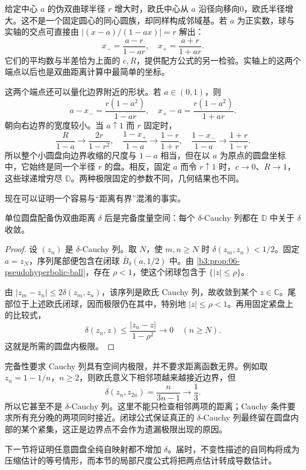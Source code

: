 给定中心 \(a\) 的伪双曲球半径 \(r\) 增大时，欧氏中心从 \(a\) 沿径向移向0，欧氏半径增大。这不是一个固定圆心的同心圆族，却同样构成邻域基。若 \(a\) 为正实数，球与实轴的交点可直接由 \(|(x-a)/(1-ax)|=r\) 解出：
\[
 x_- =\frac{a-r}{1-ar},\quad x_+=\frac{a+r}{1+ar}.
\]
它们的平均数与半差恰为上面的 \(c,R\)，提供配方公式的另一检验。实轴上的这两个端点以后也是双曲距离计算中最简单的坐标。

\ProseParagraphBreak
这两个端点还可以量化边界附近的形状。若 \(a\in(0,1)\)，则
\[
 a-x_-=\frac{r(1-a^2)}{1-ar},\quad
 x_+-a=\frac{r(1-a^2)}{1+ar}.
\]
朝向右边界的宽度较小。当 \(a\uparrow1\) 而 \(r\) 固定时，
\[
 \frac{R}{1-a}\longrightarrow\frac{2r}{1-r^2},\quad
 \frac{1-x_+}{1-a}\longrightarrow\frac{1-r}{1+r},\quad
 \frac{1-x_-}{1-a}\longrightarrow\frac{1+r}{1-r}.
\]
所以整个小圆盘向边界收缩的尺度与 \(1-a\) 相当，但在以 \(a\) 为原点的圆盘坐标中，它始终是同一个半径 \(r\) 的盘。相反，固定 \(a\) 而令 \(r\uparrow1\) 时，\(c\to0\)、\(R\to1\)，这些球递增穷尽 \(\mathbb D\)。两种极限固定的参数不同，几何结果也不同。

\ProseParagraphBreak

现在可以证明一个容易与“距离有界”混淆的事实。

\begin{proposition}\label{b3:prop:06-pseudohyperbolic-complete}
单位圆盘配备伪双曲距离 \(\delta\) 后是完备度量空间：每个 \(\delta\)-Cauchy 列都在 \(\mathbb D\) 中关于 \(\delta\) 收敛。
\end{proposition}
\begin{proof}
设 \((z_n)\) 是 \(\delta\)-Cauchy 列。取 \(N\)，使 \(m,n\ge N\) 时 \(\delta(z_m,z_n)<1/2\)。固定 \(a=z_N\)，序列尾部便包含在闭球 \(\overline B_\delta(a,1/2)\) 中。由 \cref{b3:prop:06-pseudohyperbolic-ball}，存在 \(\rho<1\)，使这个闭球包含于 \(\{|z|\le\rho\}\)。

由 \(|z_m-z_n|\le2\delta(z_m,z_n)\)，该序列是欧氏 Cauchy 列，故收敛到某个 \(z\in\mathbb C\)。尾部位于上述欧氏闭球，因而极限仍在其中，特别地 \(|z|\le\rho<1\)。再用固定紧盘上的比较式，
\[
 \delta(z_n,z)\le\frac{|z_n-z|}{1-\rho^2}\longrightarrow0
 \quad(n\ge N).
\]
这就是所需的圆盘内极限。
\end{proof}

完备性要求 Cauchy 列具有空间内极限，并不要求距离函数无界。例如取 \(z_n=1-1/n\)，\(n\ge2\)，则欧氏意义下相邻项越来越接近边界，但
\[
 \delta(z_n,z_{2n})=\frac{n}{3n-1}\longrightarrow\frac13.
\]
所以它甚至不是 \(\delta\)-Cauchy 列。这里不能只检查相邻两项的距离；Cauchy 条件要求所有充分晚的两项同时接近。闭球公式保证真正的 \(\delta\)-Cauchy 列最终留在圆盘内部的某个紧集，这正是边界点不会作为遗漏极限出现的原因。

下一节将证明任意圆盘全纯自映射都不增加 \(\delta\)。届时，不变性描述的自同构将成为压缩估计的等号情形，而本节的局部尺度公式将把两点估计转成导数估计。
